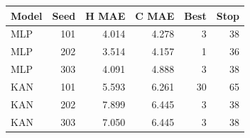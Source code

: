 \begin{center}
\small
\setlength{\tabcolsep}{4pt}
\begin{tabular}{@{}lrrrrr@{}}
\toprule
Model & Seed & H MAE & C MAE & Best & Stop\\
\midrule
MLP & 101 & 4.014 & 4.278 & 3 & 38\\
MLP & 202 & 3.514 & 4.157 & 1 & 36\\
MLP & 303 & 4.091 & 4.888 & 3 & 38\\
KAN & 101 & 5.593 & 6.261 & 30 & 65\\
KAN & 202 & 7.899 & 6.445 & 3 & 38\\
KAN & 303 & 7.050 & 6.445 & 3 & 38\\
\bottomrule
\end{tabular}
\end{center}